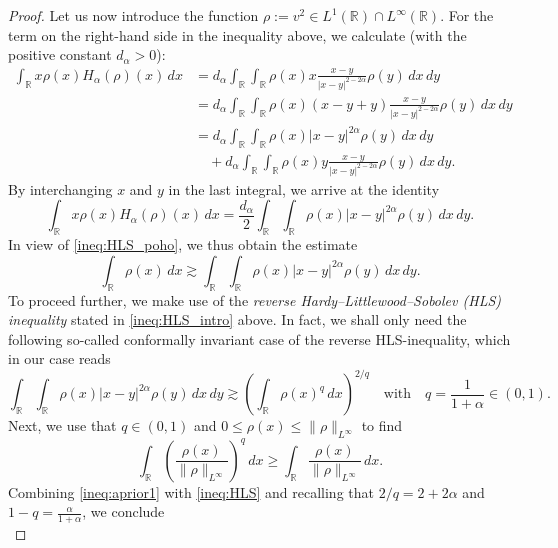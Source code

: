 \documentclass[reqno,10pt,a4paper]{amsart}
\theoremstyle{definition}
\theoremstyle{definition}
\theoremstyle{remark}
\theoremstyle{remark}
\numberwithin{equation}{section}
\newcommand{\R}{\mathbb{R}}
\newcommand{\be}{\begin{equation}}
\newcommand{\ee}{\end{equation}}
\begin{document}
\begin{proof}
    Let us now introduce the function $\rho := v^2 \in L^1(\mathbb{R}) \cap L^\infty(\mathbb{R})$. For the term on the right-hand side in the inequality above, we calculate (with the positive constant $d_\alpha > 0$):
    \begin{align*}
    \int_\mathbb{R} x \rho (x) H_\alpha(\rho)(x) \, dx & = d_\alpha \int_{\mathbb{R}} \! \int_{\mathbb{R}} \rho(x) x \frac{x-y}{|x-y|^{2 - 2 \alpha}} \rho(y) \, dx \, dy \\
    & =  d_\alpha \int_{\mathbb{R}} \! \int_{\mathbb{R}} \rho(x) (x-y+y) \frac{x-y}{|x-y|^{2 - 2 \alpha}} \rho(y) \, dx \, dy \\
    & = d_\alpha \int_{\mathbb{R}} \! \int_{\mathbb{R}} \rho(x) |x-y|^{2 \alpha} \rho(y) \, dx \,dy  \\
    & \quad + d_\alpha \int_{\mathbb{R}} \! \int_{\mathbb{R}} \rho(x) y \frac{x-y}{|x-y|^{2-2\alpha}} \rho(y) \,dx \,dy.
    \end{align*}
    By interchanging $x$ and $y$ in the last integral, we arrive at the identity 
    \begin{equation}
        \int_\mathbb{R} x \rho(x) H_\alpha(\rho)(x) \, dx = \frac{d_\alpha}{2} \int_\mathbb{R} \! \int_{\mathbb{R}} \rho(x) |x-y|^{2 \alpha} \rho(y) \, dx \, dy.
    \end{equation}
    In view of \eqref{ineq:HLS_poho}, we thus obtain the estimate
    \begin{equation} \label{ineq:aprior1}
        \int_{\mathbb{R}} \rho(x) \, dx \gtrsim \int_{\mathbb{R}} \! \int_{\mathbb{R}} \rho(x) |x-y|^{2 \alpha} \rho(y) \, dx \, dy. 
    \end{equation}
    To proceed further, we make use of the {\em reverse Hardy--Littlewood--Sobolev (HLS) inequality} stated in \eqref{ineq:HLS_intro} above. In fact, we shall only need the following so-called conformally invariant case of the reverse HLS-inequality, which in our case reads
  \be \label{ineq:HLS}
      \int_{\mathbb{R}} \! \int_{\mathbb{R}} \rho(x) |x-y|^{2 \alpha} \rho(y) \, dx \, dy \gtrsim \left ( \int_\mathbb{R} \rho(x)^q \, dx \right )^{2/q} \quad \mbox{with} \quad q = \frac{1}{1+\alpha} \in (0,1) .
\ee
    Next, we use that $q \in (0,1)$ and $0 \leq \rho(x) \leq \| \rho \|_{L^\infty}$ to find  
    $$
    \int_\R \left ( \frac{\rho(x)}{\| \rho \|_{L^\infty}} \right )^q \, dx \geq \int_{\R} \frac{\rho(x)}{\| \rho \|_{L^\infty}} \, dx . 
      $$ 
    Combining \eqref{ineq:aprior1} with \eqref{ineq:HLS} and recalling that $2/q= 2 + 2 \alpha$ and $1-q=\frac{\alpha}{1+\alpha}$, we conclude
    \begin{equation}

\end{equation}
\end{proof}
\end{document}
